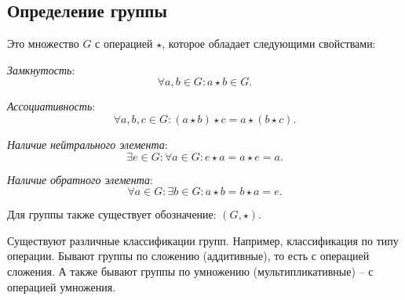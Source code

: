 \subsection{Определение группы}

\begin{definition}
    [Группа]
    Это множество $G$ с операцией $\star$, которое обладает следующими свойствами: 
    \begin{conditions}
        \item \textit{Замкнутость}: $$\forall a, b \in G: a \star b \in G.$$
        \item \textit{Ассоциативность}: $$\forall a, b, c \in G: (a \star b) \star c = a \star (b \star c).$$
        \item \textit{Наличие нейтрального элемента}: $$\exists e \in G: \forall a \in G: e \star a = a \star e = a.$$
        \item \textit{Наличие обратного элемента}: $$\forall a \in G: \exists b \in G: a \star b = b \star a = e.$$
    \end{conditions}
    Для группы также существует обозначение: $(G, \star).$
\end{definition}

Существуют различные классификации групп. Например, классификация по типу операции. 
Бывают группы по сложению (аддитивные), то есть с операцией сложения. 
А также бывают группы по умножению (мультипликативные) -- с операцией умножения.

